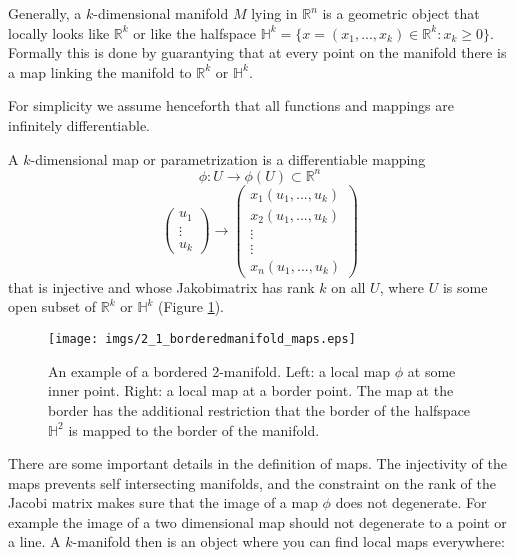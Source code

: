 Generally, a $k$-dimensional manifold $M$ lying in $\mathbb R^n$ is a geometric object that locally looks like $\mathbb R^k$ or like the halfspace $\mathbb H^k = \{x= (x_1,...,x_k) \in \mathbb R^k : x_k \geq 0\}$.  Formally this is done by guarantying that at every point on the manifold there is a map linking the manifold to $\mathbb R^k$ or $\mathbb H^k$.

For simplicity we assume henceforth that all functions and mappings are infinitely differentiable.
		
		
\begin{definition}[Map] A $k$-dimensional map or parametrization is a differentiable mapping 
\[\phi: U \rightarrow \phi(U)\subset \mathbb R^n\] 
\[\begin{pmatrix}
	u_1\\ \vdots \\ u_k
\end{pmatrix} \rightarrow \begin{pmatrix}x_1(u_1,...,u_k)\\x_2(u_1,...,u_k)\\ \vdots \\ \vdots \\ x_n(u_1,...,u_k)\end{pmatrix}\]
that is injective and whose Jakobimatrix has rank $k$ on all $U$, where $U$ is some open subset of $\mathbb R^k$ or $\mathbb H^k$ (Figure \ref{fig::2_1_mapping}). 		
\end{definition} 

\begin{figure}
	\begin{center}
		\texttt{[image: imgs/2\_1\_borderedmanifold\_maps.eps]}
		\caption{An example of a bordered 2-manifold. Left: a local map $\phi$ at some inner point. Right: a local map at a border point. The map at the border has the additional restriction that the border of the halfspace $\mathbb H^2$ is mapped to the border of the manifold.}
		\label{fig::2_1_mapping}
	\end{center}
\end{figure}

There are some important details in the definition of maps. The injectivity of the maps prevents self intersecting manifolds, and the constraint on the rank of the Jacobi matrix makes sure that the image of a map $\phi$ does not degenerate. For example the image of a two dimensional map should not degenerate to a point or a line. A $k$-manifold then is an object where you can find local maps everywhere:

